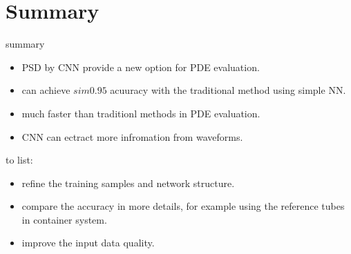 \documentclass[11pt,compress,xcolor=x11names,UTF8]{beamer}
\begin{document}
\section{Summary}
\begin{frame}{summary }
\begin{itemize}
\item PSD by CNN provide a new option for PDE evaluation.
\item can achieve $sim 0.95$ acuuracy with the traditional method using simple NN. 
\item  much faster than traditionl methods in PDE evaluation.
\item  CNN can ectract more infromation from waveforms.
\end{itemize}
to list:
\begin{itemize}
\item refine the training samples and network structure. 
\item  compare the accuracy in more details, for example using the reference tubes in container system. 
\item  improve the input data quality. 
\end{itemize}
\end{frame}
\end{document}
